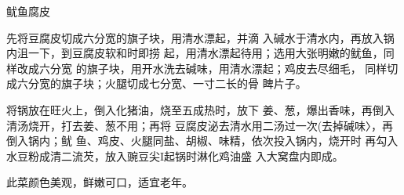 \begin{recipe}{鱿鱼腐皮}

\ingredients



\cooking

\step 	先将豆腐皮切成六分宽的旗子块，用清水漂起，并滴 入碱水于清水内，再放入锅内沮一下，到豆腐皮软和时即捞 起，用清水漂起待用；选用大张明嫩的鱿鱼，同样改成六分宽 的旗子块，用开水洗去碱味，用清水漂起；鸡皮去尽细毛， 同样切成六分宽的旗子块；火腿切成七分宽、一寸二长的骨 睥片子。

\step 	将锅放在旺火上，倒入化猪油，烧至五成热时，放下 姜、葱，爆出香味，再倒入清汤烧开，打去姜、葱不用；再将 豆腐皮泌去清水用二汤过一次(去掉碱味〉，再倒入锅内；鱿 鱼、鸡皮、火腿同盐、胡椒、味精，依次投入锅内，烧开时 再勾入水豆粉成清二流芡，放入豌豆尖I起锅时淋化鸡油盛 入大窝盘内即成。

\notes

此菜颜色美观，鲜嫩可口，适宜老年。

\end{recipe}


